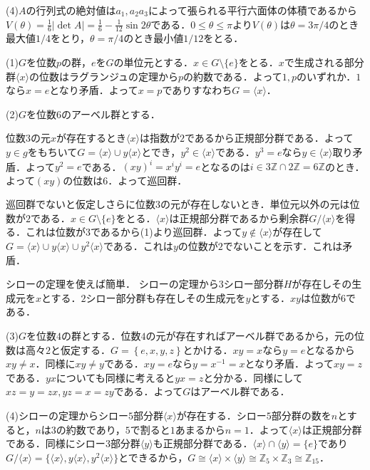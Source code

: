\documentclass[
		book,
		head_space=20mm,
		foot_space=20mm,
		gutter=10mm,
		line_length=190mm
]{jlreq}
\begin{document}
(4)$A$の行列式の絶対値は$a_1,a_2a_3$によって張られる平行六面体の体積であるから$V(\theta)=\frac{1}{6}|\det A|=\frac{1}{6}-\frac{1}{12}\sin2\theta$である．$0\le \theta\le \pi$より$V(\theta)$は$\theta=3\pi/4$のとき最大値$1/4$をとり，$\theta=\pi/4$のとき最小値$1/12$をとる．

(1)$G$を位数$p$の群，$e$を$G$の単位元とする．$x \in G \setminus\{ e\}$をとる．$x$で生成される部分群$\langle x \rangle$の位数はラグランジュの定理から$p$の約数である．よって$1,p$のいずれか．$1$なら$x=e$となり矛盾．よって$x=p$でありすなわち$G=\langle x \rangle$．

(2)$G$を位数$6$のアーベル群とする．

位数$3$の元$x$が存在するとき$\langle x \rangle $は指数が$2$であるから正規部分群である．よって$y\in g$をもちいて$G=\langle x \rangle\cup y\langle x \rangle$とでき，$y^2\in \langle x \rangle$である．$y^3=e$なら$y\in \langle x \rangle$取り矛盾．よって$y^2=e$である．$(xy)^i=x^iy^i=e$となるのは$i\in 3 \mathbb{Z}\cap 2\mathbb{Z}=6 \mathbb{Z}$のとき．よって$(xy)$の位数は$6$．よって巡回群．

巡回群でないと仮定しさらに位数$3$の元が存在しないとき．単位元以外の元は位数が$2$である．$x\in G \setminus\{e \}$をとる．$\langle x \rangle $は正規部分群であるから剰余群$G/ \langle x \rangle$を得る．これは位数が$3$であるから(1)より巡回群．よって$y \notin \langle x \rangle$が存在して$G=\langle x\rangle\cup y\langle x\rangle\cup y^2\langle x\rangle$である．これは$y$の位数が$2$でないことを示す．これは矛盾．

\begin{tcolorbox}[blanker,breakable,
    left=3mm,right=3mm,
    top=3mm,bottom=3mm,
    before skip=15pt,after skip=15pt,
    borderline vertical={1pt}{0pt}{black,dotted}]
    シローの定理を使えば簡単．
    シローの定理から$3$シロー部分群$H$が存在しその生成元を$x$とする．$2$シロー部分群も存在しその生成元を$y$とする．$xy$は位数が$6$である．
    \end{tcolorbox}

(3)$G$を位数$4$の群とする．位数$4$の元が存在すればアーベル群であるから，元の位数は高々$2$と仮定する．$G=\left\{ e,x,y,z\right\}$とかける．$xy=x$なら$y=e$となるから$xy\neq x$．同様に$xy\neq y$である．$xy=e$なら$y=x^{-1}=x$となり矛盾．よって$xy=z$である．$yx$についても同様に考えると$yx=z$と分かる．同様にして$xz=y=zx,yz=x=zy$である．よって$G$はアーベル群である．


(4)シローの定理からシロー$5$部分群$\langle x \rangle$が存在する．シロー$5$部分群の数を$n$とすると，$n$は$3$の約数であり，$5$で割ると$1$あまるから$n=1$．よって$\langle x \rangle$は正規部分群である．同様にシロー$3$部分群$\langle y \rangle$も正規部分群である．$\langle x \rangle \cap \langle y \rangle =\{ e\}$であり$G/\langle x \rangle =\{ \langle x \rangle ,y\langle x \rangle ,y^2\langle x \rangle \}$とできるから，$G \cong \langle x \rangle \times \langle y \rangle\cong \mathbb{Z}_5 \times \mathbb{Z}_3\cong \mathbb{Z}_{15}$．
\end{document}
